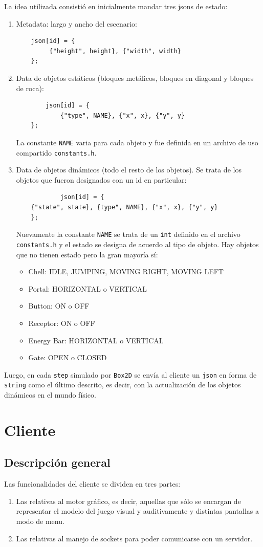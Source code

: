 \documentclass[a4paper]{article}
\begin{document}
La idea utilizada consistió en inicialmente mandar tres jsons de estado:
\begin{enumerate}
	\item Metadata: largo y ancho del escenario:
	\begin{verbatim}
	json[id] = {
		 {"height", height}, {"width", width}
	};
	\end{verbatim}
	\item Data de objetos estáticos (bloques metálicos, bloques en diagonal y bloques de roca):
	\begin{verbatim}
		json[id] = {
			{"type", NAME}, {"x", x}, {"y", y}
	};
	\end{verbatim}
	La constante \texttt{NAME} varia para cada objeto y fue definida en un archivo de uso compartido \texttt{constants.h}.
	\item Data de objetos dinámicos (todo el resto de los objetos). Se trata de los objetos que fueron designados con un id en particular:
	\begin{verbatim}
			json[id] = {
	{"state", state}, {type", NAME}, {"x", x}, {"y", y}
	};
	\end{verbatim}
	Nuevamente la constante \texttt{NAME} se trata de un \texttt{int} definido en el archivo \texttt{constants.h} y el estado se designa de acuerdo al tipo de objeto. Hay objetos que no tienen estado pero la gran mayoría sí:
	\begin{itemize}
		\item Chell: IDLE, JUMPING, MOVING RIGHT, MOVING LEFT
		\item Portal: HORIZONTAL o VERTICAL
		\item Button: ON o OFF
		\item Receptor: ON o OFF
		\item Energy Bar: HORIZONTAL o VERTICAL
		\item Gate: OPEN o CLOSED
	\end{itemize}
\end{enumerate}

Luego, en cada \texttt{step} simulado por \texttt{Box2D} se envía al cliente un \texttt{json} en forma de \texttt{string} como el último descrito, es decir, con la actualización de los objetos dinámicos en el mundo físico.

\section{Cliente}

\subsection{Descripción general}
Las funcionalidades del cliente se dividen en tres partes:
\begin{enumerate}
	\item Las relativas al motor gráfico, es decir, aquellas que sólo se encargan de representar el modelo del juego visual y auditivamente y distintas pantallas a modo de menu.
	\item Las relativas al manejo de sockets para poder comunicarse con un servidor.
\end{enumerate}
\end{document}
